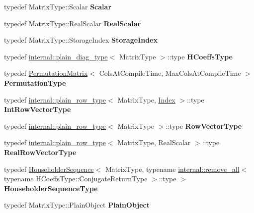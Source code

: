\begin{DoxyCompactItemize}
typedef Matrix\+Type\+::\+Scalar {\bfseries Scalar}
\item 
\mbox{\label{group___q_r___module_a55487671adbf44783c3c8b109cb0a14d}} 
typedef Matrix\+Type\+::\+Real\+Scalar {\bfseries Real\+Scalar}
\item 
\mbox{\label{group___q_r___module_aa5d396f5f75b59073a6ed5c0f54bfd42}} 
typedef Matrix\+Type\+::\+Storage\+Index {\bfseries Storage\+Index}
\item 
\mbox{\label{group___q_r___module_a5773b249a76bed6f46e04b9a2c832019}} 
typedef \hyperlink{struct_eigen_1_1internal_1_1plain__diag__type}{internal\+::plain\+\_\+diag\+\_\+type}$<$ Matrix\+Type $>$\+::type {\bfseries H\+Coeffs\+Type}
\item 
\mbox{\label{group___q_r___module_a04a1ec15296f9c62857e98e7699fe2a9}} 
typedef \hyperlink{group___core___module_class_eigen_1_1_permutation_matrix}{Permutation\+Matrix}$<$ Cols\+At\+Compile\+Time, Max\+Cols\+At\+Compile\+Time $>$ {\bfseries Permutation\+Type}
\item 
\mbox{\label{group___q_r___module_a6a936341a807b4c526edeae544ed3c50}} 
typedef \hyperlink{struct_eigen_1_1internal_1_1plain__row__type}{internal\+::plain\+\_\+row\+\_\+type}$<$ Matrix\+Type, \hyperlink{namespace_eigen_a62e77e0933482dafde8fe197d9a2cfde}{Index} $>$\+::type {\bfseries Int\+Row\+Vector\+Type}
\item 
\mbox{\label{group___q_r___module_ad2e5d38156d09b36f4c57b7746092ad1}} 
typedef \hyperlink{struct_eigen_1_1internal_1_1plain__row__type}{internal\+::plain\+\_\+row\+\_\+type}$<$ Matrix\+Type $>$\+::type {\bfseries Row\+Vector\+Type}
\item 
\mbox{\label{group___q_r___module_afb69477038a2efe1a09072fa46030be9}} 
typedef \hyperlink{struct_eigen_1_1internal_1_1plain__row__type}{internal\+::plain\+\_\+row\+\_\+type}$<$ Matrix\+Type, Real\+Scalar $>$\+::type {\bfseries Real\+Row\+Vector\+Type}
\item 
\mbox{\label{group___q_r___module_a55b37f691cf7c54edd525b551eefe566}} 
typedef \hyperlink{group___householder___module_class_eigen_1_1_householder_sequence}{Householder\+Sequence}$<$ Matrix\+Type, typename \hyperlink{struct_eigen_1_1internal_1_1remove__all}{internal\+::remove\+\_\+all}$<$ typename H\+Coeffs\+Type\+::\+Conjugate\+Return\+Type $>$\+::type $>$ {\bfseries Householder\+Sequence\+Type}
\item 
\mbox{\label{group___q_r___module_aa3945dfd3f2109bd7f26a4acefe9f769}} 
typedef Matrix\+Type\+::\+Plain\+Object {\bfseries Plain\+Object}
\end{DoxyCompactItemize}
